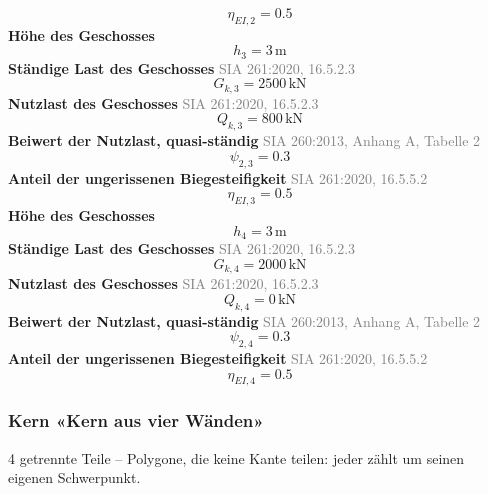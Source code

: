 \documentclass[11pt,a4paper]{article}
\newcommand{\normref}[1]{{\small\textcolor{gray}{#1}}}
\begin{document}
\begin{equation*}
\eta_{EI,2} = 0.5
\end{equation*}
\noindent\textbf{Höhe des Geschosses}
\begin{equation*}
h_{3} = 3\,\mathrm{m}
\end{equation*}
\noindent\textbf{Ständige Last des Geschosses} \hfill \normref{SIA 261:2020, 16.5.2.3}
\begin{equation*}
G_{k,3} = 2500\,\mathrm{kN}
\end{equation*}
\noindent\textbf{Nutzlast des Geschosses} \hfill \normref{SIA 261:2020, 16.5.2.3}
\begin{equation*}
Q_{k,3} = 800\,\mathrm{kN}
\end{equation*}
\noindent\textbf{Beiwert der Nutzlast, quasi-ständig} \hfill \normref{SIA 260:2013, Anhang A, Tabelle 2}
\begin{equation*}
\psi_{2,3} = 0.3
\end{equation*}
\noindent\textbf{Anteil der ungerissenen Biegesteifigkeit} \hfill \normref{SIA 261:2020, 16.5.5.2}
\begin{equation*}
\eta_{EI,3} = 0.5
\end{equation*}
\noindent\textbf{Höhe des Geschosses}
\begin{equation*}
h_{4} = 3\,\mathrm{m}
\end{equation*}
\noindent\textbf{Ständige Last des Geschosses} \hfill \normref{SIA 261:2020, 16.5.2.3}
\begin{equation*}
G_{k,4} = 2000\,\mathrm{kN}
\end{equation*}
\noindent\textbf{Nutzlast des Geschosses} \hfill \normref{SIA 261:2020, 16.5.2.3}
\begin{equation*}
Q_{k,4} = 0\,\mathrm{kN}
\end{equation*}
\noindent\textbf{Beiwert der Nutzlast, quasi-ständig} \hfill \normref{SIA 260:2013, Anhang A, Tabelle 2}
\begin{equation*}
\psi_{2,4} = 0.3
\end{equation*}
\noindent\textbf{Anteil der ungerissenen Biegesteifigkeit} \hfill \normref{SIA 261:2020, 16.5.5.2}
\begin{equation*}
\eta_{EI,4} = 0.5
\end{equation*}
\subsubsection{Kern «Kern aus vier Wänden»}
4 getrennte Teile – Polygone, die keine Kante teilen: jeder zählt um seinen eigenen Schwerpunkt.
\end{document}

